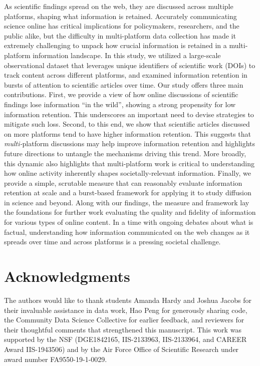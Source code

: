 \documentclass[letterpaper]{article} %
\begin{document}
As scientific findings spread on the web, they are discussed across multiple platforms, shaping what information is retained. Accurately communicating science online has critical implications for policymakers, researchers, and the public alike, but the difficulty in multi-platform data collection has made it extremely challenging to unpack how crucial information is retained in a multi-platform information landscape. In this study, we utilized a large-scale observational dataset that leverages unique identifiers of scientific work (DOIs) to track content across different platforms, and examined information retention in bursts of attention to scientific articles over time. Our study offers three main contributions. First, we provide a view of how online discussions of scientific findings lose information ``in the wild'', showing a strong propensity for low information retention. This underscores an important need to devise strategies to mitigate such loss. Second, to this end, we show that scientific articles discussed on more platforms tend to have higher information retention. This suggests that \textit{multi-}platform discussions may help improve information retention and highlights future directions to untangle the mechanisms driving this trend. More broadly, this dynamic also highlights that multi-platform work is critical to understanding how online activity inherently shapes societally-relevant information. Finally, we provide a simple, scrutable measure that can reasonably evaluate information retention at scale and a burst-based framework for applying it to study diffusion in science and beyond. Along with our findings, the measure and framework lay the foundations for further work evaluating the quality and fidelity of information for various types of online content. In a time with ongoing debates about what is factual, understanding how information communicated on the web changes as it spreads over time and across platforms is a pressing societal challenge.

\section{Acknowledgments}
The authors would like to thank students Amanda Hardy and Joshua Jacobs for their invaluable assistance in data work, Hao Peng for generously sharing code, the Community Data Science Collective for earlier feedback, and reviewers for their thoughtful comments that strengthened this manuscript. This work was supported by the NSF (DGE1842165, IIS-2133963, IIS-2133964, and CAREER Award IIS-1943506) and by the Air Force Office of Scientific Research under award number FA9550-19-1-0029.


\end{document}
